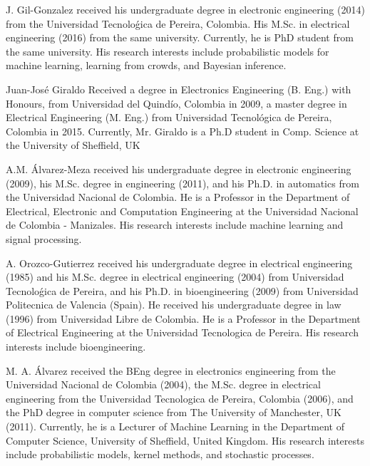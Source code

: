 \documentclass[journal]{IEEEtran}
\begin{document}
\vspace{-1.0cm}
\begin{IEEEbiographynophoto}{J. Gil-Gonzalez}
received his undergraduate degree in electronic engineering (2014) from the Universidad Tecnoloǵica de Pereira, Colombia. His M.Sc. in electrical engineering (2016) from the same university. Currently, he is PhD student from the same university. His research interests include probabilistic models for machine learning, learning from crowds, and Bayesian inference.
\end{IEEEbiographynophoto}
\vspace{-1.0cm}
\begin{IEEEbiographynophoto}{Juan-José Giraldo}
Received a degree in Electronics Engineering (B. Eng.)
with Honours, from Universidad del Quind\'io, Colombia in 2009, a master degree in Electrical Engineering (M. Eng.) from Universidad Tecnológica de Pereira, Colombia in 2015. Currently, Mr. Giraldo is a Ph.D student in Comp. Science at the University of Sheffield, UK
\end{IEEEbiographynophoto}
\vspace{-1.0cm}
\begin{IEEEbiographynophoto}{A.M. Álvarez-Meza}
received his undergraduate degree in electronic engineering (2009), his M.Sc. degree in engineering (2011), and his Ph.D. in automatics from the Universidad Nacional de Colombia. He is a Professor in the Department of Electrical, Electronic and Computation Engineering at the Universidad Nacional de Colombia - Manizales. His research interests include machine learning and signal processing.
\end{IEEEbiographynophoto}
\vspace{-1.0cm}
\begin{IEEEbiographynophoto}{A. Orozco-Gutierrez}
received his undergraduate degree in electrical engineering (1985) and his M.Sc. degree in electrical engineering (2004) from Universidad Tecnoloǵica de Pereira, and his Ph.D. in bioengineering (2009) from Universidad Politecnica de Valencia (Spain). He received his undergraduate degree in law (1996) from Universidad Libre de Colombia. He is a Professor in the Department of Electrical Engineering at the Universidad Tecnologica de Pereira. His research interests include bioengineering.
\end{IEEEbiographynophoto}
\vspace{-1.0cm}
\begin{IEEEbiographynophoto}{M. A. Álvarez}
received the BEng degree in electronics engineering from the Universidad Nacional de Colombia (2004), the M.Sc. degree
in electrical engineering from the Universidad Tecnologica de Pereira, Colombia (2006), and the PhD degree in computer science from The University of Manchester, UK (2011). Currently, he is a Lecturer of Machine Learning in the Department of Computer Science, University of Sheffield, United Kingdom. His research interests include probabilistic models, kernel methods, and stochastic processes.
\end{IEEEbiographynophoto}
\end{document}
